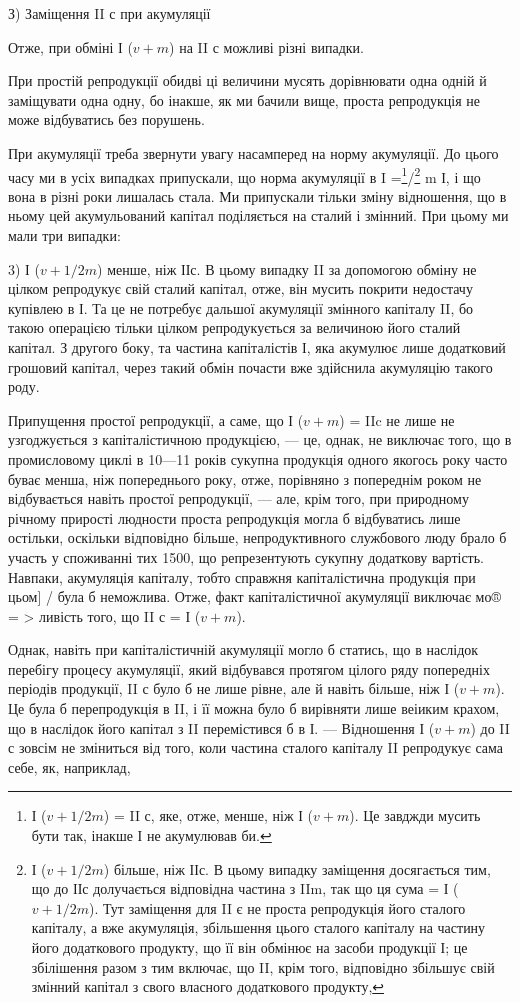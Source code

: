 З) Заміщення II с при акумуляції

Отже, при обміні І ($v + m$) на II с можливі різні випадки.

При простій репродукції обидві ці величини мусять дорівнювати одна
одній й заміщувати одна одну, бо інакше, як ми бачили вище, проста
репродукція не може відбуватись без порушень.

При акумуляції треба звернути увагу насамперед на норму акумуляції.
До цього часу ми в усіх випадках припускали, що норма акумуляції в
I =\footnote{
І ($v + 1/2m$) = II с, яке, отже, менше, ніж І ($v + m$). Це завджди
мусить бути так, інакше І не акумулював би.
}/\footnote{
І ($v + 1/2m$) більше, ніж ІІс. В цьому випадку заміщення досягається
тим, що до ІІс долучається відповідна частина з IIm, так що
ця сума = І ($v + 1/2 m$). Тут заміщення для II є не проста репродукція
його сталого капіталу, а вже акумуляція, збільшення цього сталого капіталу
на частину його додаткового продукту, що її він обмінює на засоби
продукції І; це збілішення разом з тим включає, що II, крім того, відповідно
збільшує свій змінний капітал з свого власного додаткового продукту,
} m І, і що вона в різні роки лишалась стала. Ми припускали
тільки зміну відношення, що в ньому цей акумульований капітал поділяється
на сталий і змінний. При цьому ми мали три випадки:

3) І ($v + 1/2m$) менше, ніж ІІс. В цьому випадку II за допомогою
обміну не цілком репродукує свій сталий капітал, отже, він мусить покрити
недостачу купівлею в І. Та це не потребує дальшої акумуляції
змінного капіталу II, бо такою операцією тільки цілком репродукується
за величиною його сталий капітал. З другого боку, та частина капіталістів
І, яка акумулює лише додатковий грошовий капітал, через такий
обмін почасти вже здійснила акумуляцію такого роду.

Припущення простої репродукції, а саме, що І ($v + m$) = IIc не лише
не узгоджується з капіталістичною продукцією, — це, однак, не виключає
того, що в промисловому циклі в 10—11 років сукупна продукція одного
якогось року часто буває менша, ніж попереднього року, отже,
порівняно з попереднім роком не відбувається навіть простої репродукції,
— але, крім того, при природному річному прирості людности проста
репродукція могла б відбуватись лише остільки, оскільки відповідно
більше, непродуктивного службового люду брало б участь у споживанні
тих 1500, що репрезентують сукупну додаткову вартість. Навпаки, акумуляція
капіталу, тобто справжня капіталістична продукція при цьом] /
була б неможлива. Отже, факт капіталістичної акумуляції виключає мо® = >
ливість того, що II с = І ($v + m$).

Однак, навіть при капіталістичній акумуляції могло б статись, що в
наслідок перебігу процесу акумуляції, який відбувався протягом цілого
ряду попередніх періодів продукції, II с було б не лише рівне, але й навіть
більше, ніж І ($v + m$). Це була б перепродукція в II, і її можна було б
вирівняти лише веіиким крахом, що в наслідок його капітал з II перемістився
б в І. — Відношення І ($v + m$) до II с зовсім не зміниться від того,
коли частина сталого капіталу II репродукує сама себе, як, наприклад,
\parbreak{}  %
